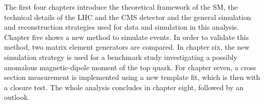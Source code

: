 The first four chapters introduce the theoretical framework of the SM, the technical details of the LHC and the CMS detector and the general simulation and reconstruction strategies used for data and simulation in this analysis. Chapter five shows a new method to simulate \ttgamma events. In order to validate this method, two matrix element generators are compared. In chapter six, the new simulation strategy is used for a benchmark study investigating a possibly anomalous magnetic-dipole moment of the top quark. For chapter seven, a \ttgamma cross section measurement is implemented using a new template fit, which is then with a closure test. The whole analysis concludes in chapter eight, followed by an outlook. 